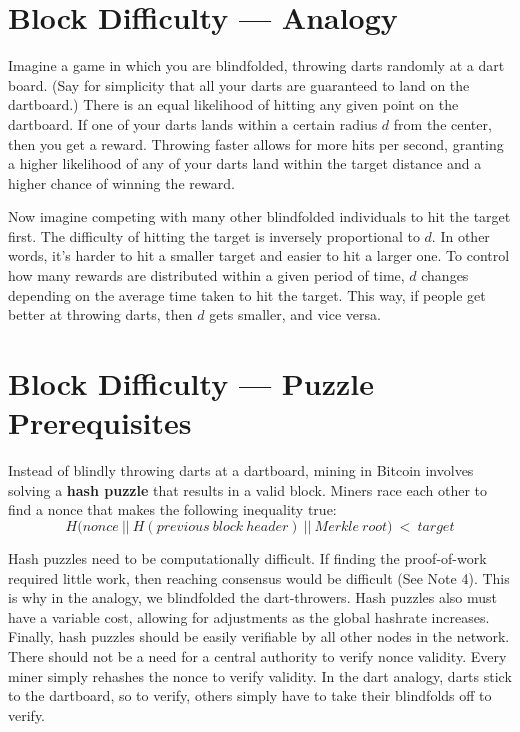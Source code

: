 \documentclass[full.tex]{subfiles}
\begin{document}
    \section*{Block Difficulty --- Analogy}
    
    Imagine a game in which you are blindfolded, throwing darts randomly at a dart board. (Say for simplicity that all your darts are guaranteed to land on the dartboard.) There is an equal likelihood of hitting any given point on the dartboard. If one of your darts lands within a certain radius $d$ from the center, then you get a reward. Throwing faster allows for more hits per second, granting a higher likelihood of any of your darts land within the target distance and a higher chance of winning the reward. 
    
    Now imagine competing with many other blindfolded individuals to hit the target first. The difficulty of hitting the target is inversely proportional to $d$. In other words, it's harder to hit a smaller target and easier to hit a larger one. To control how many rewards are distributed within a given period of time, $d$ changes depending on the average time taken to hit the target. This way, if people get better at throwing darts, then $d$ gets smaller, and vice versa.
    
    \section*{Block Difficulty --- Puzzle Prerequisites}
    
    Instead of blindly throwing darts at a dartboard, mining in Bitcoin involves solving a \textbf{hash puzzle} that results in a valid block. Miners race each other to find a nonce that makes the following inequality true:
    $$H\big(nonce~||~H(previous~block~header)~||~Merkle~root\big)~<~target$$
    
    Hash puzzles need to be computationally difficult. If finding the proof-of-work required little work, then reaching consensus would be difficult (See Note 4). This is why in the analogy, we blindfolded the dart-throwers. Hash puzzles also must have a variable cost, allowing for adjustments as the global hashrate increases. Finally, hash puzzles should be easily verifiable by all other nodes in the network. There should not be a need for a central authority to verify nonce validity. Every miner simply rehashes the nonce to verify validity. In the dart analogy, darts stick to the dartboard, so to verify, others simply have to take their blindfolds off to verify.
    
\end{document}
